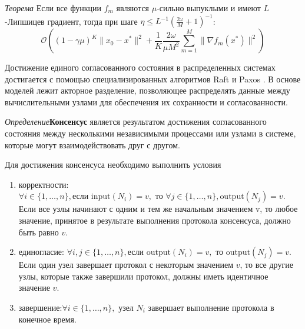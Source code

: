 \textit{Теорема}\cite{stich2019unified} Если все функции $f_m$ являются $\mu$-сильно выпуклыми
и имеют $L$-Липшицев градиент, тогда при шаге $\eta \le L^{-1} (\frac{2 \omega}{M}+1)^{-1}$:
\begin{equation}
    \mathcal{O}\left(
        (1-\gamma \mu)^K \|x_0 -x^*\|^2 + \frac{1}{K} \frac{2 \omega}{\mu M^2} \sum_{m=1}^M \| \nabla f_m(x^*) \|^2
    \right)
\end{equation}

Достижение единого согласованного состояния в распределенных системах достигается с помощью специализированных алгоритмов  
Raft \cite{lamport2019time} и Paxos \cite{pease1980reaching}. 
В основе моделей лежит акторное разделение, позволяющее распределять данные между вычислительными узлами для обеспечения их 
сохранности и согласованности. 

\textit{Определение}\textbf{Консенсус} является результатом достижения согласованного состояния между несколькими независимыми 
процессами или узлами в системе, которые могут взаимодействовать друг с другом. 

Для достижения консенсуса необходимо выполнить условия \begin{enumerate}
    \item корректности: $\forall i \in \{1, \ldots, n\}, \text{если } \text{input}(N_i) = v, \text{ то } \forall j \in \{1, \ldots, n\}, \text{output}(N_j) = v$.
     Если все узлы начинают с одним и тем же начальным значением v, то любое значение, принятое в результате 
     выполнения протокола консенсуса, должно быть равно \( v \).
    \item единогласие: $\forall i, j \in \{1, \ldots, n\}, \text{если } \text{output}(N_i) = v, \text{ то } \text{output}(N_j) = v$.
     Если один узел завершает протокол с некоторым значением \( v \), то все другие узлы, которые также завершили протокол,
     должны иметь идентичное значение \( v \).
    \item завершение:$\forall i \in \{1, \ldots, n\}, \text{ узел } N_i$ 
    завершает выполнение протокола в конечное время.
\end{enumerate}


